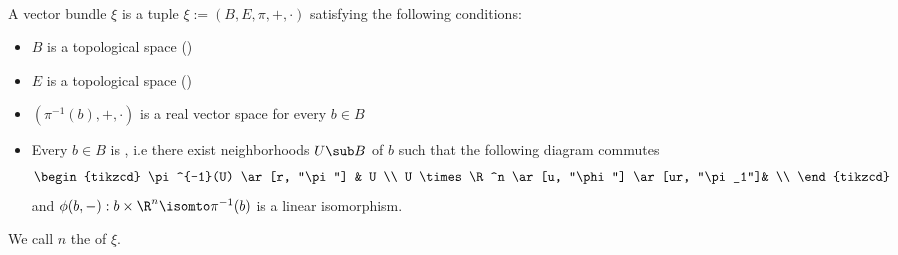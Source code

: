\\ A vector bundle $\xi$ is a tuple $\xi := (B, E, \pi, +, \cdot)$ satisfying the following conditions:
\begin{itemize}
    \item $B$ is a topological space ()
    \item $E$ is a topological space ()
    \item $(\pi^{-1}(b), +, \cdot)$ is a real vector space for every $b \in B$
    \item Every $b \in B$ is , i.e there exist neighborhoods $U \sub B$ of $b$ such that the following diagram commutes
    \[\begin{tikzcd}
        \pi^{-1}(U) \ar[r, "\pi"] & U \\
        U \times \R^n \ar[u, "\phi"] \ar[ur, "\pi_1"]& \\
    \end{tikzcd}\]
    and $\phi(b, -): b \times \R^n \isomto \pi^{-1}(b)$ is a linear isomorphism.
\end{itemize}
We call $n$ the  of $\xi$.